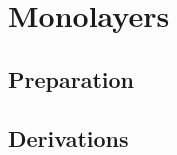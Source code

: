 \documentclass[\main/dresen_thesis.tex]{subfiles}
\begin{document}
\chapter{Monolayers}\label{ch:monolayers}
  \section{Preparation}
    


\begin{appendices}
  \chapter{Derivations}
    
\end{appendices}

\printbibliography
\end{document}
